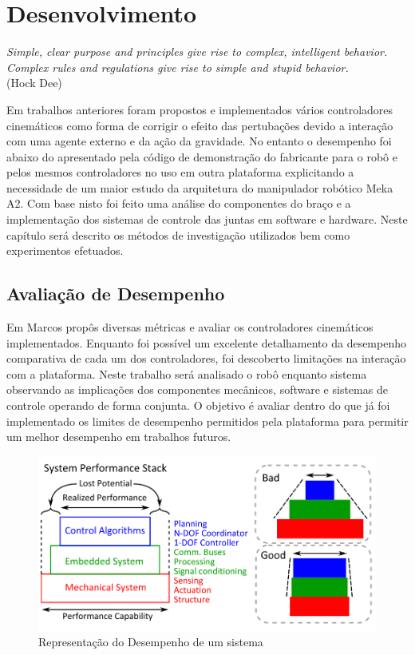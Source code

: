 \chapter{Desenvolvimento\label{ch:develop}}

\begin{flushright}
\textit{Simple, clear purpose and principles give rise to complex, intelligent behavior. Complex rules and regulations give rise to simple and stupid behavior.}\\(Hock Dee)
\end{flushright}

Em trabalhos anteriores foram propostos e implementados vários controladores cinemáticos como forma de corrigir o efeito das pertubações devido a interação com uma agente externo e da ação da gravidade. No entanto o desempenho foi abaixo do apresentado pela código de demonstração do fabricante para o robô e pelos mesmos controladores no uso em outra plataforma explicitando a necessidade de um maior estudo da arquitetura do manipulador robótico Meka A2. Com base nisto foi feito uma análise do componentes do braço e a implementação dos sistemas de controle das juntas em software e hardware. Neste capítulo será descrito os métodos de investigação utilizados bem como experimentos efetuados.

\section{Avaliação de Desempenho}

Em \cite{nocite} Marcos propôs diversas métricas e avaliar os controladores cinemáticos implementados. Enquanto foi possível um excelente detalhamento da desempenho comparativa de cada um dos controladores, foi descoberto limitações na interação com a plataforma. Neste trabalho será analisado o robô enquanto sistema observando as implicações dos componentes mecânicos, software e sistemas de controle operando de forma conjunta. O objetivo é avaliar dentro do que já foi implementado os limites de desempenho permitidos pela plataforma para permitir um melhor desempenho em trabalhos futuros. 

\begin{figure}[H]
    \centering
    \includegraphics[width = \linewidth]{tex/figs/system_perfomance.png}
    \caption{Representação do Desempenho de um sistema \cite{paine2014high}}
    \label{fig:system_perfomance}
\end{figure}

